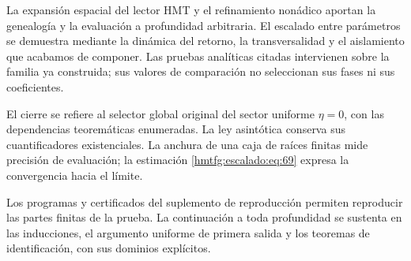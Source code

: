 La expansión espacial del lector HMT y el refinamiento nonádico aportan la genealogía y la evaluación a profundidad arbitraria. El escalado entre parámetros se demuestra mediante la dinámica del retorno, la transversalidad y el aislamiento que acabamos de componer. Las pruebas analíticas citadas intervienen sobre la familia ya construida; sus valores de comparación no seleccionan sus fases ni sus coeficientes.

El cierre se refiere al selector global original del sector uniforme \(\eta=0\), con las dependencias teoremáticas enumeradas. La ley asintótica conserva sus cuantificadores existenciales. La anchura de una caja de raíces finitas mide precisión de evaluación; la estimación \eqref{hmtfg:escalado:eq:69} expresa la convergencia hacia el límite.


Los programas y certificados del suplemento de reproducción permiten reproducir las partes finitas de la prueba. La continuación a toda profundidad se sustenta en las inducciones, el argumento uniforme de primera salida y los teoremas de identificación, con sus dominios explícitos.
